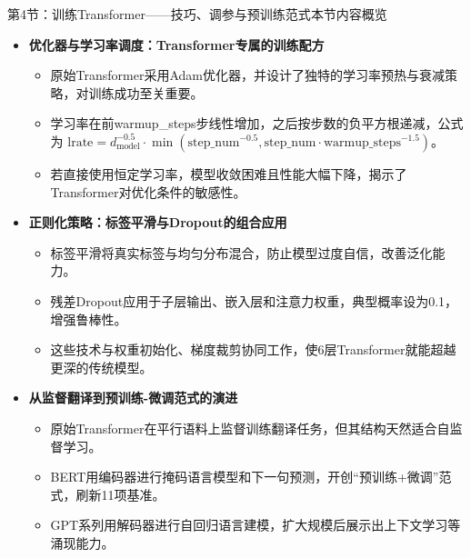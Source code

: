 \documentclass[11pt]{beamer}
\begin{document}
\begin{frame}{第4节：训练Transformer——技巧、调参与预训练范式}{本节内容概览}
\begin{itemize}
    \item \textbf{优化器与学习率调度：Transformer专属的训练配方}
    \begin{itemize}
        \item 原始Transformer采用Adam优化器，并设计了独特的学习率预热与衰减策略，对训练成功至关重要。
        \item 学习率在前warmup\_steps步线性增加，之后按步数的负平方根递减，公式为 $\text{lrate} = d_{\text{model}}^{-0.5} \cdot \min(\text{step\_num}^{-0.5}, \text{step\_num} \cdot \text{warmup\_steps}^{-1.5})$。
        \item 若直接使用恒定学习率，模型收敛困难且性能大幅下降，揭示了Transformer对优化条件的敏感性。
    \end{itemize}
    \item \textbf{正则化策略：标签平滑与Dropout的组合应用}
    \begin{itemize}
        \item 标签平滑将真实标签与均匀分布混合，防止模型过度自信，改善泛化能力。
        \item 残差Dropout应用于子层输出、嵌入层和注意力权重，典型概率设为0.1，增强鲁棒性。
        \item 这些技术与权重初始化、梯度裁剪协同工作，使6层Transformer就能超越更深的传统模型。
    \end{itemize}
    \item \textbf{从监督翻译到预训练-微调范式的演进}
    \begin{itemize}
        \item 原始Transformer在平行语料上监督训练翻译任务，但其结构天然适合自监督学习。
        \item BERT用编码器进行掩码语言模型和下一句预测，开创“预训练+微调”范式，刷新11项基准。
        \item GPT系列用解码器进行自回归语言建模，扩大规模后展示出上下文学习等涌现能力。
    \end{itemize}
\end{itemize}
\end{frame}
\end{document}
